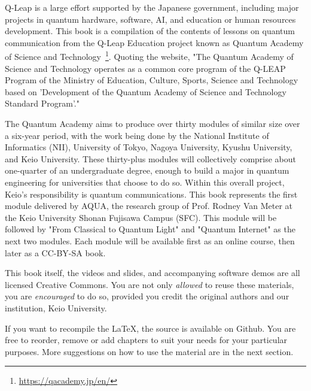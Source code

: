 
\begin{preface}
Q-Leap is a large effort supported by the Japanese government, including major projects in quantum hardware, software, AI, and education or human resources development.  This book is a compilation of the contents of lessons on quantum communication from the Q-Leap Education project known as Quantum Academy of Science and Technology~\footnote{\url{https://qacademy.jp/en/}}. Quoting the website, "The Quantum Academy of Science and Technology operates as a common core program of the Q-LEAP Program of the Ministry of Education, Culture, Sports, Science and Technology based on 'Development of the Quantum Academy of Science and Technology Standard Program'."

The Quantum Academy aims to produce over thirty modules of similar size over a six-year period, with the work being done by the National Institute of Informatics (NII), University of Tokyo, Nagoya University, Kyushu University, and Keio University.  These thirty-plus modules will collectively comprise about one-quarter of an undergraduate degree, enough to build a major in quantum engineering for universities that choose to do so. Within this overall project, Keio's responsibility is quantum communications.  This book represents the first module delivered by AQUA, the research group of Prof. Rodney Van Meter at the Keio University Shonan Fujisawa Campus (SFC).  This module will be followed by "From Classical to Quantum Light" and "Quantum Internet" as the next two modules.  Each module will be available first as an online course, then later as a CC-BY-SA book.

This book itself, the videos and slides, and accompanying software demos are all licensed Creative Commons. You are not only \emph{allowed} to reuse these materials, you are \emph{encouraged} to do so, provided you credit the original authors and our institution, Keio University.

If you want to recompile the \LaTeX, the source is available on Github. You are free to reorder, remove or add chapters to suit your needs for your particular purposes.  More suggestions on how to use the material are in the next section.

\author{Michal and Rodney}
\date{sometime in 2023}
\end{preface}

